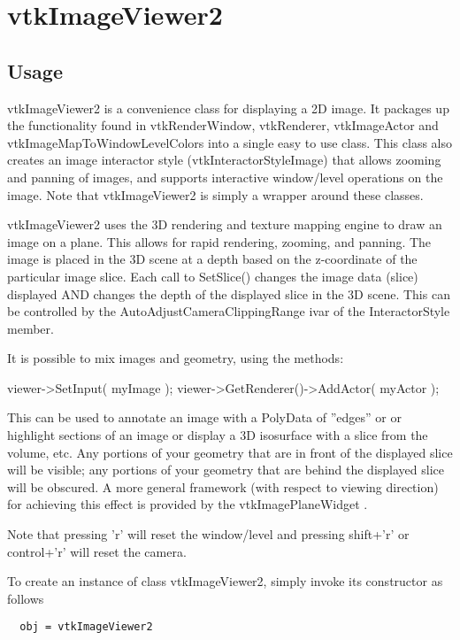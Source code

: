\section{vtkImageViewer2}

\subsection{Usage}

 vtkImageViewer2 is a convenience class for displaying a 2D image.  It
 packages up the functionality found in vtkRenderWindow, vtkRenderer,
 vtkImageActor and vtkImageMapToWindowLevelColors into a single easy to use
 class.  This class also creates an image interactor style
 (vtkInteractorStyleImage) that allows zooming and panning of images, and
 supports interactive window/level operations on the image. Note that
 vtkImageViewer2 is simply a wrapper around these classes.

 vtkImageViewer2 uses the 3D rendering and texture mapping engine
 to draw an image on a plane.  This allows for rapid rendering,
 zooming, and panning. The image is placed in the 3D scene at a
 depth based on the z-coordinate of the particular image slice. Each
 call to SetSlice() changes the image data (slice) displayed AND
 changes the depth of the displayed slice in the 3D scene. This can
 be controlled by the AutoAdjustCameraClippingRange ivar of the
 InteractorStyle member.

 It is possible to mix images and geometry, using the methods:

 viewer->SetInput( myImage );
 viewer->GetRenderer()->AddActor( myActor );

 This can be used to annotate an image with a PolyData of ''edges'' or
 or highlight sections of an image or display a 3D isosurface
 with a slice from the volume, etc. Any portions of your geometry
 that are in front of the displayed slice will be visible; any
 portions of your geometry that are behind the displayed slice will
 be obscured. A more general framework (with respect to viewing
 direction) for achieving this effect is provided by the
 vtkImagePlaneWidget .

 Note that pressing 'r' will reset the window/level and pressing
 shift+'r' or control+'r' will reset the camera.


To create an instance of class vtkImageViewer2, simply
invoke its constructor as follows
\begin{verbatim}
  obj = vtkImageViewer2
\end{verbatim}
